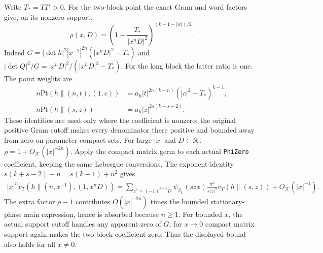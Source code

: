 Write $T_*=TT'>0$.  For the two-block point the exact Gram and
word factors give, on its nonzero support,
\[
 \rho(x,D)=
 \left(1-\frac{T_*}{|x^nD|^2}\right)^{(k-1-|w|)/2}.
\]
Indeed $G=|\det h|^2|x^{-1}|^{2n}(|x^nD|^2-T_*)$ and
$|\det Q|^2/G=|x^nD|^2/(|x^nD|^2-T_*)$.
For the long block the latter ratio is one.  The point weights
are
\[
 \begin{split}
 n\mathrm{Pt}(h\mathbin{\|}(n,t),(1,c))
       &=a_h|t|^{2n(k+n)}(|c|^2-T_*)^{k-1},\\
 n\mathrm{Pt}(h\mathbin{\|}(s,z))
       &=a_h|z|^{2s(k+s-2)}.
 \end{split}
\]
These identities are used only where the coefficient is nonzero;
the original positive Gram cutoff makes every denominator there
positive and bounded away from zero on parameter compact sets.
For large $|x|$ and $D\in\mathcal K$,
$\rho=1+O_{\mathcal K}(|x|^{-2n})$.  Apply the compact matrix
germ to each actual \texttt{PhiZero} coefficient, keeping the same
Lebesgue conversions.  The exponent identity
$s(k+s-2)-n=s(k-1)+n^2$ gives
\begin{equation}\label{block-growth-top-germ}
 \begin{split}
 |x|^n v_T(h\mathbin{\|}(n,x^{-1}),(1,x^nD))
   =\sum_{z^s=(-1)^{s+1}D}
       \psi_{\beta_U}(szx)\frac{\pi^n}{s|z|^n}
                  v_T(h\mathbin{\|}(s,z))+O_{\mathcal K}(|x|^{-1}).
 \end{split}
\end{equation}
The extra factor $\rho-1$ contributes $O(|x|^{-2n})$ times
the bounded stationary-phase main expression, hence is absorbed
because $n\ge1$.  For bounded $x$, the actual support cutoff
handles any apparent zero of $G$; for $x\to0$ compact matrix
support again makes the two-block coefficient zero.
Thus the displayed bound also holds for all $x\ne0$.

